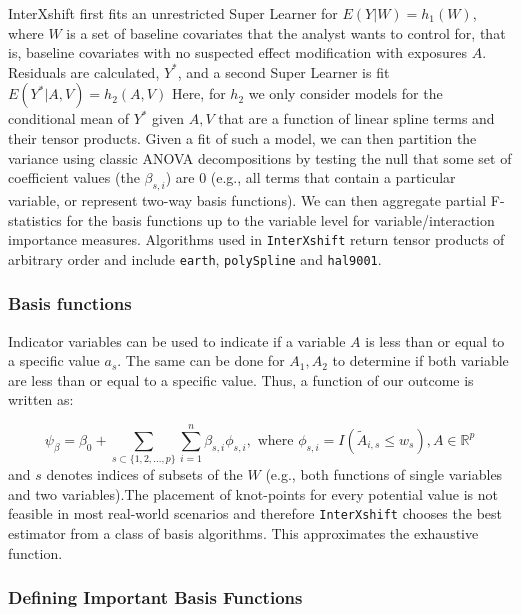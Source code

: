 \documentclass[
]{article}
\begin{document}
InterXshift first fits an unrestricted Super Learner for
\(E(Y|W) = h_1(W)\), where \(W\) is a set of baseline covariates that
the analyst wants to control for, that is, baseline covariates with no
suspected effect modification with exposures \(A\). Residuals are
calculated, \(Y^*\), and a second Super Learner is fit
\(E(Y^*|A,V) = h_2(A,V)\) Here, for \(h_2\) we only consider models for
the conditional mean of \(Y^*\) given \(A,V\) that are a function of
linear spline terms and their tensor products. Given a fit of such a
model, we can then partition the variance using classic ANOVA
decompositions by testing the null that some set of coefficient values
(the \(\beta_{s,i}\)) are 0 (e.g., all terms that contain a particular
variable, or represent two-way basis functions). We can then aggregate
partial F-statistics for the basis functions up to the variable level
for variable/interaction importance measures. Algorithms used in
\texttt{InterXshift} return tensor products of arbitrary order and include
\texttt{earth}, \texttt{polySpline} and \texttt{hal9001}.

\hypertarget{basis-functions}{%
\subsubsection{Basis functions}\label{basis-functions}}

Indicator variables can be used to indicate if a variable \(A\) is less
than or equal to a specific value \(a_s\). The same can be done for
\(A_1, A_2\) to determine if both variable are less than or equal to a
specific value. Thus, a function of our outcome is written as:

\[\psi_{\beta} = \beta_0 + \sum_{s\subset \{1,2,...,p\}}\sum_{i=1}^{n} \beta_{s,i} \phi_{s,i},
    \text{ where } \phi_{s,i} = I(\tilde{A}_{i,s} \leq w_s), A \in \mathbb{R}^p\]
and \(s\) denotes indices of subsets of the \(W\) (e.g., both functions
of single variables and two variables).The placement of knot-points for
every potential value is not feasible in most real-world scenarios and
therefore \texttt{InterXshift} chooses the best estimator from a class of
basis algorithms. This approximates the exhaustive function.

\hypertarget{defining-important-basis-functions}{%
\subsubsection{Defining Important Basis
Functions}\label{defining-important-basis-functions}}
\end{document}
